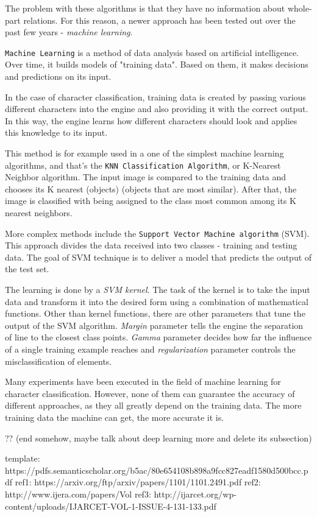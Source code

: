 The problem with these algorithms is that they have no information about whole-part relations. For this reason, a newer approach has been tested out over the past few years - \emph{machine learning}.

\texttt{Machine Learning} is a method of data analysis based on artificial intelligence. Over time, it builds models of "training data". Based on them, it makes decisions and predictions on its input. 

In the case of character classification, training data is created by passing various different characters into the engine and also providing it with the correct output. In this way, the engine learns how different characters should look and applies this knowledge to its input.

This method is for example used in a one of the simplest machine learning algorithms, and that's the \texttt{KNN Classification Algorithm}, or K-Nearest Neighbor algorithm. The input image is compared to the training data and chooses its K nearest (objects) (objects that are most similar). After that, the image is classified with being assigned to the class most common among its K nearest neighbors.

More complex methods include the \texttt{Support Vector Machine algorithm} (SVM). This approach divides the data received into two classes - training and testing data. The goal of SVM technique is to deliver a model that predicts the output of the test set.

The learning is done by a \emph{SVM kernel}. The task of the kernel is to take the input data and transform it into the desired form using a combination of mathematical functions. Other than kernel functions, there are other parameters that tune the output of the SVM algorithm. \emph{Margin} parameter tells the engine the separation of line to the closest class points. \emph{Gamma} parameter decides how far the influence of a single training example reaches and \emph{regularization} parameter controls the misclassification of elements.

Many experiments have been executed in the field of machine learning for character classification. However, none of them can guarantee the accuracy of different approaches, as they all greatly depend on the training data. The more training data the machine can get, the more accurate it is. 

?? (end somehow, maybe talk about deep learning more and delete its subsection)

template: https://pdfs.semanticscholar.org/b5ac/80e654108b898a9fcc827eadf1580d500bcc.pdf
ref1: https://arxiv.org/ftp/arxiv/papers/1101/1101.2491.pdf
ref2: http://www.ijera.com/papers/Vol%
ref3: http://ijarcet.org/wp-content/uploads/IJARCET-VOL-1-ISSUE-4-131-133.pdf

